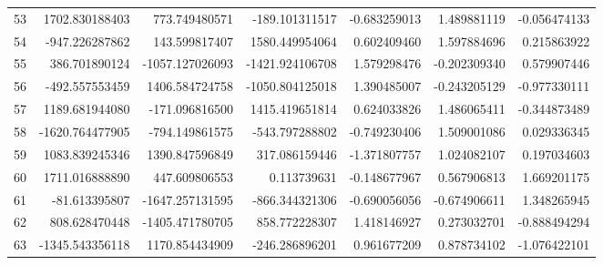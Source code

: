 \begin{longtable}{rrrrrrr}
53 & 1702.830188403 & 773.749480571 & -189.101311517 & -0.683259013 & 1.489881119 & -0.056474133 \\
54 & -947.226287862 & 143.599817407 & 1580.449954064 & 0.602409460 & 1.597884696 & 0.215863922 \\
55 & 386.701890124 & -1057.127026093 & -1421.924106708 & 1.579298476 & -0.202309340 & 0.579907446 \\
56 & -492.557553459 & 1406.584724758 & -1050.804125018 & 1.390485007 & -0.243205129 & -0.977330111 \\
57 & 1189.681944080 & -171.096816500 & 1415.419651814 & 0.624033826 & 1.486065411 & -0.344873489 \\
58 & -1620.764477905 & -794.149861575 & -543.797288802 & -0.749230406 & 1.509001086 & 0.029336345 \\
59 & 1083.839245346 & 1390.847596849 & 317.086159446 & -1.371807757 & 1.024082107 & 0.197034603 \\
60 & 1711.016888890 & 447.609806553 & 0.113739631 & -0.148677967 & 0.567906813 & 1.669201175 \\
61 & -81.613395807 & -1647.257131595 & -866.344321306 & -0.690056056 & -0.674906611 & 1.348265945 \\
62 & 808.628470448 & -1405.471780705 & 858.772228307 & 1.418146927 & 0.273032701 & -0.888494294 \\
63 & -1345.543356118 & 1170.854434909 & -246.286896201 & 0.961677209 & 0.878734102 & -1.076422101 \\
\bottomrule
\end{longtable}
